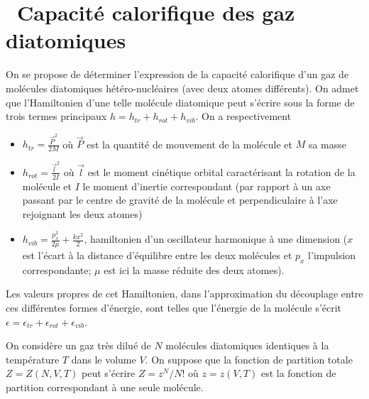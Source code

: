 \documentclass[utf8, 11pt]{feuille}
\begin{document}
\section{\medium~Capacité calorifique des gaz diatomiques}

On se propose de déterminer l'expression de la capacité calorifique d'un gaz de molécules diatomiques  hétéro-nucléaires (avec deux atomes différents). On admet que l'Hamiltonien d'une telle molécule diatomique peut s'écrire sous la forme de trois termes principaux $h = h_{tr} + h_{rot} + h_{vib}$. On a respectivement

\begin{itemize}

\item 
$h_{tr} =\frac{\vec{P}^2}{2M}$ où $\vec{P}$ est la quantité de mouvement de la molécule et $M$ sa masse

\item
$h_{rot} =\frac{\vec{l}^2}{2I}$ où $\vec{l}$ est le moment cinétique orbital caractérisant la rotation de la molécule et $I$ le moment d'inertie correspondant (par rapport à  un axe passant par le centre de gravité de la molécule et perpendiculaire à  l'axe rejoignant les deux atomes)

\item
$h_{vib} =\frac{p_x^2}{2\mu}+\frac{k x^2}{2}$, hamiltonien d'un oscillateur harmonique à  une dimension ($x$ est l'écart à  la distance d'équilibre entre les deux molécules et $p_x$ l'impulsion correspondante; $\mu$ est ici la masse réduite des deux atomes).

\end{itemize}


Les valeurs propres de cet Hamiltonien, dans l'approximation du découplage entre ces différentes formes d'énergie, sont telles que l'énergie de la molécule s'écrit $\epsilon =\epsilon_{tr}+\epsilon_{rot}+\epsilon_{vib}$.

On considère un gaz très dilué de $N$ molécules diatomiques identiques à  la température $T$ dans le volume $V$. On suppose que la fonction de partition totale $Z=Z(N,V,T)$ peut s'écrire $Z= z^N/N!$ où $z=z(V,T)$ est la fonction de partition correspondant à  une seule molécule.


\end{document}
